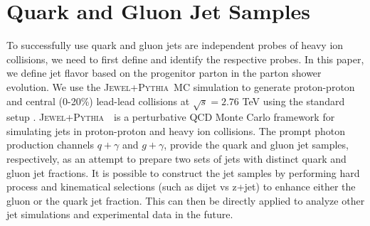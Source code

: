 \documentclass[notoc]{JHEP3}
\newcommand{\jw}{\textsc{Jewel}~}
\newcommand{\jwpy}{\textsc{Jewel+Pythia}~}
\begin{document}


\section{Quark and Gluon Jet Samples}
\label{sec:sample}

To successfully use quark and gluon jets are independent probes of heavy ion collisions, we need to first define and identify the respective probes. In this paper, we define jet flavor based on the progenitor parton in the parton shower evolution. We use the \jwpy MC simulation to generate proton-proton and central (0-20\%) lead-lead collisions at $\sqrt{s}=2.76$ TeV using the standard setup \cite{Zapp:2013zya}. \jwpy ~is a perturbative QCD Monte Carlo framework for simulating jets in proton-proton and heavy ion collisions. The prompt photon production channels \cite{KunnawalkamElayavalli:2016ttl} $q +\gamma$ and $g +\gamma$, provide the quark and gluon jet samples, respectively, as an attempt to prepare two sets of jets with distinct quark and gluon jet fractions. It is possible to construct the jet samples by performing hard process and kinematical selections (such as dijet vs z+jet) to enhance either the gluon or the quark jet fraction. This can then be directly applied to analyze other jet simulations and experimental data in the future. 
\end{document}
